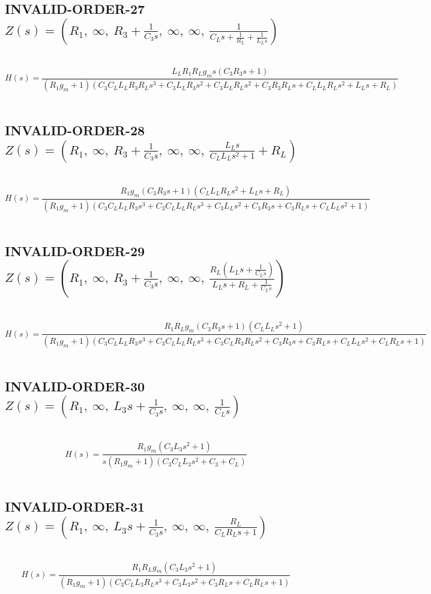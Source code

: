 \documentclass{article}
\begin{document}
\subsection{INVALID-ORDER-27 $Z(s) = \left( R_{1}, \  \infty, \  R_{3} + \frac{1}{C_{3} s}, \  \infty, \  \infty, \  \frac{1}{C_{L} s + \frac{1}{R_{L}} + \frac{1}{L_{L} s}}\right)$ } \ 
\textbf{\[H(s) = \frac{L_{L} R_{1} R_{L} g_{m} s \left(C_{3} R_{3} s + 1\right)}{\left(R_{1} g_{m} + 1\right) \left(C_{3} C_{L} L_{L} R_{3} R_{L} s^{3} + C_{3} L_{L} R_{3} s^{2} + C_{3} L_{L} R_{L} s^{2} + C_{3} R_{3} R_{L} s + C_{L} L_{L} R_{L} s^{2} + L_{L} s + R_{L}\right)}\] } \ 
\subsection{INVALID-ORDER-28 $Z(s) = \left( R_{1}, \  \infty, \  R_{3} + \frac{1}{C_{3} s}, \  \infty, \  \infty, \  \frac{L_{L} s}{C_{L} L_{L} s^{2} + 1} + R_{L}\right)$ } \ 
\textbf{\[H(s) = \frac{R_{1} g_{m} \left(C_{3} R_{3} s + 1\right) \left(C_{L} L_{L} R_{L} s^{2} + L_{L} s + R_{L}\right)}{\left(R_{1} g_{m} + 1\right) \left(C_{3} C_{L} L_{L} R_{3} s^{3} + C_{3} C_{L} L_{L} R_{L} s^{3} + C_{3} L_{L} s^{2} + C_{3} R_{3} s + C_{3} R_{L} s + C_{L} L_{L} s^{2} + 1\right)}\] } \ 
\subsection{INVALID-ORDER-29 $Z(s) = \left( R_{1}, \  \infty, \  R_{3} + \frac{1}{C_{3} s}, \  \infty, \  \infty, \  \frac{R_{L} \left(L_{L} s + \frac{1}{C_{L} s}\right)}{L_{L} s + R_{L} + \frac{1}{C_{L} s}}\right)$ } \ 
\textbf{\[H(s) = \frac{R_{1} R_{L} g_{m} \left(C_{3} R_{3} s + 1\right) \left(C_{L} L_{L} s^{2} + 1\right)}{\left(R_{1} g_{m} + 1\right) \left(C_{3} C_{L} L_{L} R_{3} s^{3} + C_{3} C_{L} L_{L} R_{L} s^{3} + C_{3} C_{L} R_{3} R_{L} s^{2} + C_{3} R_{3} s + C_{3} R_{L} s + C_{L} L_{L} s^{2} + C_{L} R_{L} s + 1\right)}\] } \ 
\subsection{INVALID-ORDER-30 $Z(s) = \left( R_{1}, \  \infty, \  L_{3} s + \frac{1}{C_{3} s}, \  \infty, \  \infty, \  \frac{1}{C_{L} s}\right)$ } \ 
\textbf{\[H(s) = \frac{R_{1} g_{m} \left(C_{3} L_{3} s^{2} + 1\right)}{s \left(R_{1} g_{m} + 1\right) \left(C_{3} C_{L} L_{3} s^{2} + C_{3} + C_{L}\right)}\] } \ 
\subsection{INVALID-ORDER-31 $Z(s) = \left( R_{1}, \  \infty, \  L_{3} s + \frac{1}{C_{3} s}, \  \infty, \  \infty, \  \frac{R_{L}}{C_{L} R_{L} s + 1}\right)$ } \ 
\textbf{\[H(s) = \frac{R_{1} R_{L} g_{m} \left(C_{3} L_{3} s^{2} + 1\right)}{\left(R_{1} g_{m} + 1\right) \left(C_{3} C_{L} L_{3} R_{L} s^{3} + C_{3} L_{3} s^{2} + C_{3} R_{L} s + C_{L} R_{L} s + 1\right)}\] } \ 
\end{document}
